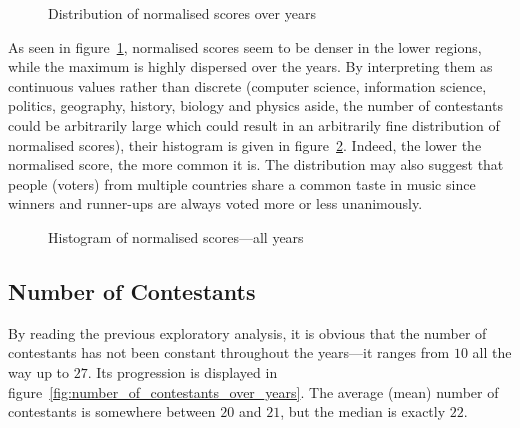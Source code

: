 \documentclass[conference, a4paper, 12pt]{IEEEtran}
\begin{document}
    \par

    \begin{figure}[tbhp!]
        \centering
        
        \caption{Distribution of normalised scores over years}
        \label{fig:distribution_of_normalised_scores_over_years}
    \end{figure}

    \par

    As seen in figure~\ref{fig:distribution_of_normalised_scores_over_years}, normalised scores seem to be denser in the lower regions, while the maximum is highly dispersed over the years. By interpreting them as continuous values rather than discrete (computer science, information science, politics, geography, history, biology and physics aside, the number of contestants could be arbitrarily large which could result in an arbitrarily fine distribution of normalised scores), their histogram is given in figure~\ref{fig:histogram_of_normalised_scores}. Indeed, the lower the normalised score, the more common it is. The distribution may also suggest that people (voters) from multiple countries share a common taste in music since winners and runner-ups are always voted more or less unanimously.

    \par

    \begin{figure}[tbhp!]
        \centering
        
        \caption[Histogram of normalised scores]{Histogram of normalised scores---all years}
        \label{fig:histogram_of_normalised_scores}
    \end{figure}

    \par

    \subsection{Number of Contestants}
    \label{subsec:number_of_contestants}

    By reading the previous exploratory analysis, it is obvious that the number of contestants has not been constant throughout the years---it ranges from $ 10 $ all the way up to $ 27 $. Its progression is displayed in figure~\ref{fig:number_of_contestants_over_years}. The average (mean) number of contestants is somewhere between $ 20 $ and $ 21 $, but the median is exactly $ 22 $.
\end{document}
